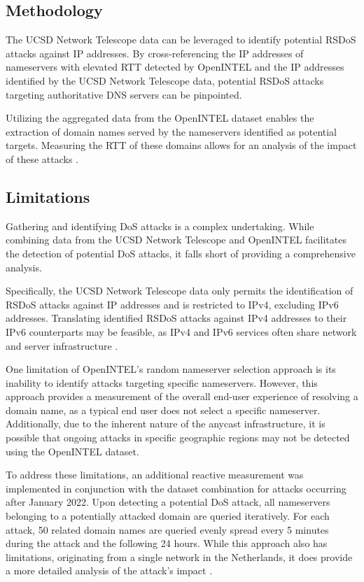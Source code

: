 \subsection{Methodology}
The UCSD Network Telescope data can be leveraged to identify potential \ac{RSDoS} attacks against IP addresses.
By cross-referencing the IP addresses of nameservers with elevated \ac{RTT} detected by OpenINTEL and the IP addresses identified by the UCSD Network Telescope data, potential \ac{RSDoS} attacks targeting authoritative DNS servers can be pinpointed.

Utilizing the aggregated data from the OpenINTEL dataset enables the extraction of domain names served by the nameservers identified as potential targets.
Measuring the RTT of these domains allows for an analysis of the impact of these attacks \cite{Sommese2022DDoSDNS}.


\subsection{Limitations} \label{subsec:limitations}
Gathering and identifying \acf{DoS} attacks is a complex undertaking.
While combining data from the UCSD Network Telescope and OpenINTEL facilitates the detection of potential DoS attacks, it falls short of providing a comprehensive analysis.

Specifically, the UCSD Network Telescope data only permits the identification of RSDoS attacks against IP addresses and is restricted to IPv4, excluding IPv6 addresses.
Translating identified RSDoS attacks against IPv4 addresses to their IPv6 counterparts may be feasible, as IPv4 and IPv6 services often share network and server infrastructure \cite{Beverly2015ServerSI}.

One limitation of OpenINTEL's random nameserver selection approach is its inability to identify attacks targeting specific nameservers.
However, this approach provides a measurement of the overall end-user experience of resolving a domain name, as a typical end user does not select a specific nameserver.
Additionally, due to the inherent nature of the anycast infrastructure, it is possible that ongoing attacks in specific geographic regions may not be detected using the OpenINTEL dataset.

To address these limitations, an additional reactive measurement was implemented in conjunction with the dataset combination for attacks occurring after January 2022.
Upon detecting a potential DoS attack, all nameservers belonging to a potentially attacked domain are queried iteratively.
For each attack, 50 related domain names are queried evenly spread every 5 minutes during the attack and the following 24 hours.
While this approach also has limitations, originating from a single network in the Netherlands, it does provide a more detailed analysis of the attack's impact \cite{Sommese2022DDoSDNS}.
